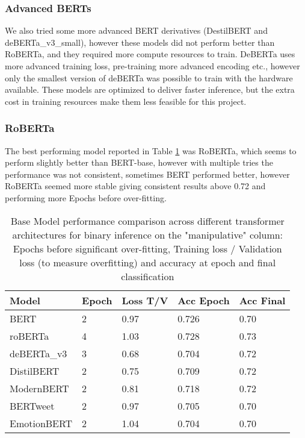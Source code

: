 \documentclass[
	letterpaper, %
	12pt, %
	unnumberedsections, %
	twoside, %
]{LTJournalArticle}
\begin{document}
\subsubsection{Advanced BERTs}
We also tried some more advanced BERT derivatives (DestilBERT and deBERTa\_v3\_small), however these models did not perform better than RoBERTa, and they required more compute resources to train. DeBERTa uses more advanced training loss, pre-training more advanced encoding etc.\cite{DeBERTaV3}, however only the smallest version of deBERTa was possible to train with the hardware available. These models are optimized to deliver faster inference, but the extra cost in training resources make them less feasible for this project.
\subsubsection{RoBERTa}
The best performing model reported in Table \ref{tab:BaseModelPerformance} was RoBERTa, which seems to perform slightly better than BERT-base, however with multiple tries the performance was not consistent, sometimes BERT performed better, however RoBERTa seemed more stable giving consistent results above 0.72 and performing more Epochs before over-fitting.


\begin{table}[h!]
	\small
	\begin{tabular}{|p{2.2cm}|p{0.9cm}|p{1cm}|p{1cm}|p{1cm}|}
		\hline
		\textbf{Model} & \textbf{Epoch} & \textbf{Loss T/V} & \textbf{Acc Epoch} & \textbf{Acc Final} \\
		\hline
		BERT           & 2              & 0.97              & 0.726              & 0.70               \\
		roBERTa        & 4              & 1.03              & 0.728              & 0.73               \\
		deBERTa\_v3    & 3              & 0.68              & 0.704              & 0.72               \\
		DistilBERT     & 2              & 0.75              & 0.709              & 0.72               \\
		ModernBERT     & 2              & 0.81              & 0.718              & 0.72               \\
		BERTweet       & 2              & 0.97              & 0.705              & 0.70               \\
		EmotionBERT    & 2              & 1.04              & 0.704              & 0.70               \\


		\hline
	\end{tabular}
	\caption{Base Model performance comparison across different transformer architectures for binary inference on the "manipulative" column: Epochs before significant over-fitting, Training loss / Validation loss (to measure  overfitting) and accuracy at epoch and final classification }
	\label{tab:BaseModelPerformance}
\end{table}
\end{document}
